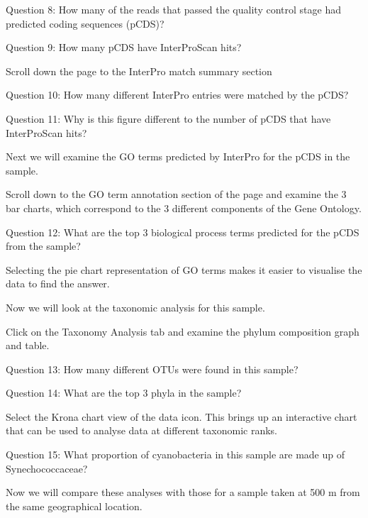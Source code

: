 \begin{questions}
Question 8: How many of the reads that passed the quality control stage had predicted coding sequences (pCDS)?

Question 9: How many pCDS have InterProScan hits?
\end{questions}

\begin{steps}
Scroll down the page to the InterPro match summary section
\end{steps}

\begin{questions}
Question 10: How many different InterPro entries were matched by the pCDS?
  
Question 11: Why is this figure different to the number of pCDS that have InterProScan hits?
\end{questions}

Next we will examine the GO terms predicted by InterPro for the pCDS in the sample.

\begin{steps}
Scroll down to the GO term annotation section of the page and examine the 3 bar charts, which correspond to the 3 different components of the Gene Ontology.

Question 12: What are the top 3 biological process terms predicted for the pCDS from the sample?

Selecting the pie chart representation of GO terms makes it easier to visualise the data to find the answer.
\end{steps}

Now we will look at the taxonomic analysis for this sample. 

\begin{steps}
Click on the Taxonomy Analysis tab and examine the phylum composition graph and table. 

Question 13: How many different OTUs were found in this sample?

Question 14: What are the top 3 phyla in the sample?

Select the Krona chart view of the data icon. This brings up an interactive chart that can be used to analyse data at different taxonomic ranks.

Question 15: What proportion of cyanobacteria in this sample are made up of Synechococcaceae?
\end{steps}

Now we will compare these analyses with those for a sample taken at 500 m from the same geographical location.


